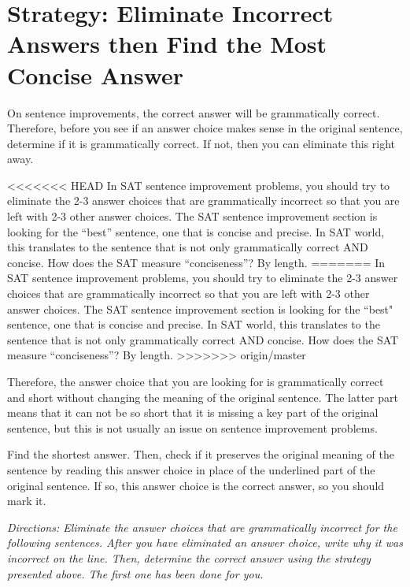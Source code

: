 \section{\sloppy Strategy: Eliminate Incorrect Answers then Find the Most Concise Answer}

On sentence improvements, the correct answer will be grammatically correct. Therefore, before
you see if an answer choice makes sense in the original sentence, determine if it is grammatically
correct. If not, then you can eliminate this right away.

<<<<<<< HEAD
In SAT sentence improvement problems, you should try to eliminate the 2-3 answer choices that are grammatically incorrect so that you are left with 2-3 other answer choices. The SAT sentence improvement section is looking for the ``best'' sentence, one that is concise and precise. In SAT world, this translates to the sentence that is not only grammatically correct AND concise. How does the SAT measure ``conciseness''? By length.
=======
\bigskip
In SAT sentence improvement problems, you should try to eliminate the 2-3 answer choices that are grammatically incorrect so that you are left with 2-3 other answer choices. The SAT sentence improvement section is looking for the ``best" sentence, one that is concise and precise. In SAT world, this translates to the sentence that is not only grammatically correct AND concise. How does the SAT measure ``conciseness''? By length.
>>>>>>> origin/master

\bigskip
Therefore, the answer choice that you are looking for is grammatically correct and short without changing the meaning of the original sentence. The latter part means that it can not be so short that it is missing a key part of the original sentence,
but this is not usually an issue on sentence improvement problems.

\bigskip
Find the shortest answer. Then, check if it preserves the original meaning of the sentence by reading this answer choice in place of the underlined part of the original sentence. If so, this answer choice is the correct answer, so you should mark it.

\bigskip
\textit{Directions: Eliminate the answer choices that are grammatically incorrect for the following sentences. After you have eliminated an answer choice, write why it was incorrect on the line. Then, determine the correct answer using the strategy presented above. The first one has been done for you.}

